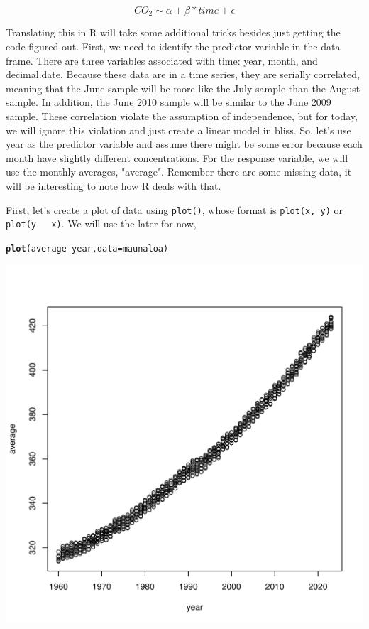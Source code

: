 \documentclass{tufte-handout}\usepackage[]{graphicx}\usepackage[]{xcolor}
\makeatletter
\def\maxwidth{ %
  \ifdim\Gin@nat@width>\linewidth
    \linewidth
  \else
    \Gin@nat@width
  \fi
}
\newcommand{\hlopt}[1]{\textcolor[rgb]{0,0,0}{#1}}%
\newcommand{\hlstd}[1]{\textcolor[rgb]{0.345,0.345,0.345}{#1}}%
\newcommand{\hlkwc}[1]{\textcolor[rgb]{0.333,0.667,0.333}{#1}}%
\newcommand{\hlkwd}[1]{\textcolor[rgb]{0.737,0.353,0.396}{\textbf{#1}}}%
\newenvironment{kframe}{%
 \def\at@end@of@kframe{}%
 \ifinner\ifhmode%
  \def\at@end@of@kframe{\end{minipage}}%
  \begin{minipage}{\columnwidth}%
 \fi\fi%
 \def\FrameCommand##1{\hskip\@totalleftmargin \hskip-\fboxsep
 \colorbox{shadecolor}{##1}\hskip-\fboxsep
     \hskip-\linewidth \hskip-\@totalleftmargin \hskip\columnwidth}%
 \MakeFramed {\advance\hsize-\width
   \@totalleftmargin\z@ \linewidth\hsize
   \@setminipage}}%
 {\par\unskip\endMakeFramed%
 \at@end@of@kframe}
\newenvironment{knitrout}{}{} %
\makeatother
\begin{document}
\begin{equation}
CO_2 \sim \alpha + \beta * time + \epsilon
\end{equation}

Translating this in R will take some additional tricks besides just getting the code figured out. First, we need to identify the predictor variable in the data frame. There are three variables associated with time: year, month, and decimal.date. Because these data are in a time series, they are serially correlated, meaning that the June sample will be more like the July sample than the August sample. In addition, the June 2010 sample will be similar to the June 2009 sample. These correlation violate the assumption of independence, but for today, we will ignore this violation and just create a linear model in bliss. So, let's use year as the predictor variable and assume there might be some error because each month have slightly different concentrations. For the response variable, we will use the monthly averages, "average". Remember there are some missing data, it will be interesting to note how R deals with that.

First, let's create a plot of data using \texttt{plot()}, whose format is \texttt{plot(x, y)} or \texttt{plot(y ~ x)}. We will use the later for now, 

\begin{knitrout}
\color{fgcolor}\begin{kframe}
\begin{alltt}
\hlkwd{plot}\hlstd{(average} \hlopt{~} \hlstd{year,} \hlkwc{data}\hlstd{=maunaloa)}
\end{alltt}
\end{kframe}
\includegraphics[width=\maxwidth]{figure/unnamed-chunk-51-1} 
\end{knitrout}
\end{document}
